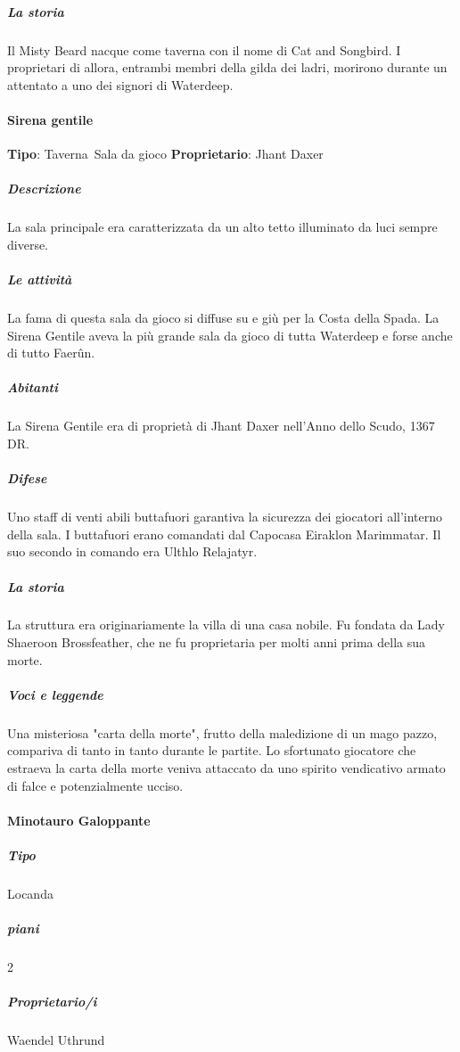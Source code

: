 \documentclass{article}
\begin{document}
                      \subparagraph{La storia}
                        Il Misty Beard nacque come taverna con il nome di Cat and Songbird. I proprietari di allora, entrambi membri della gilda dei ladri, morirono durante un attentato a uno dei signori di Waterdeep.
                  \paragraph{Sirena gentile}
                  \textbf{Tipo}: Taverna\ Sala da gioco
                  \textbf{Proprietario}: Jhant Daxer

                      \subparagraph{Descrizione}
La sala principale era caratterizzata da un alto tetto illuminato da luci sempre diverse.

                      \subparagraph{Le attività}
La fama di questa sala da gioco si diffuse su e giù per la Costa della Spada. La Sirena Gentile aveva la più grande sala da gioco di tutta Waterdeep e forse anche di tutto Faerûn.

                      \subparagraph{Abitanti}
La Sirena Gentile era di proprietà di Jhant Daxer nell'Anno dello Scudo, 1367 DR.

                      \subparagraph{Difese}
Uno staff di venti abili buttafuori garantiva la sicurezza dei giocatori all'interno della sala. I buttafuori erano comandati dal Capocasa Eiraklon Marimmatar. Il suo secondo in comando era Ulthlo Relajatyr.

                      \subparagraph{La storia}
La struttura era originariamente la villa di una casa nobile. Fu fondata da Lady Shaeroon Brossfeather, che ne fu proprietaria per molti anni prima della sua morte.
                      \subparagraph{Voci e leggende}
Una misteriosa "carta della morte", frutto della maledizione di un mago pazzo, compariva di tanto in tanto durante le partite. Lo sfortunato giocatore che estraeva la carta della morte veniva attaccato da uno spirito vendicativo armato di falce e potenzialmente ucciso.
                  \paragraph{Minotauro Galoppante}

                      \subparagraph{Tipo}
Locanda

                      \subparagraph{ piani}
2


                      \subparagraph{Proprietario/i}
Waendel Uthrund
\end{document}
